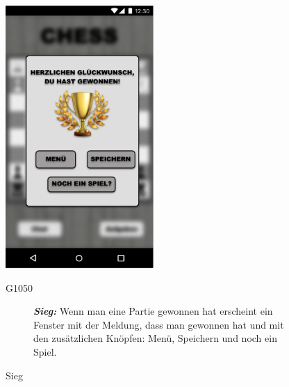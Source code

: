 \documentclass[parskip=full]{scrartcl}
\begin{document}
\begin{figure}[htp]
	\begin{minipage}[t]{6cm}
		\vspace{0pt}
		\includegraphics[height=100mm]{Sieg.png}
		\caption{Sieg}
		\label{fig:Sieg}
	\end{minipage}
	\hfill
	\begin{minipage}[t]{6cm}
		\vspace{0pt}
		\begin{description}
			\item[G1050] \textbf{\textit{Sieg: }} Wenn man eine Partie gewonnen hat erscheint ein Fenster mit der Meldung, dass man gewonnen hat und mit den zusätzlichen Knöpfen: Menü, Speichern und noch ein Spiel.
		\end{description}
	\end{minipage}


\end{figure}
\end{document}
